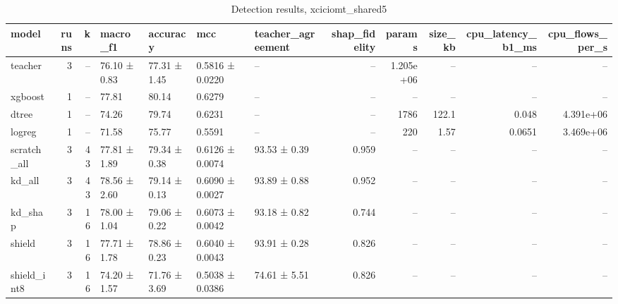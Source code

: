 \begin{table}
\caption{Detection results, xciciomt_shared5}
\begin{tabular}{lrrllllrrrrr}
\toprule
model & runs & k & macro_f1 & accuracy & mcc & teacher_agreement & shap_fidelity & params & size_kb & cpu_latency_b1_ms & cpu_flows_per_s \\
\midrule
teacher & 3 & -- & 76.10 ± 0.83 & 77.31 ± 1.45 & 0.5816 ± 0.0220 & -- & -- & 1.205e+06 & -- & -- & -- \\
xgboost & 1 & -- & 77.81 & 80.14 & 0.6279 & -- & -- & -- & -- & -- & -- \\
dtree & 1 & -- & 74.26 & 79.74 & 0.6231 & -- & -- & 1786 & 122.1 & 0.048 & 4.391e+06 \\
logreg & 1 & -- & 71.58 & 75.77 & 0.5591 & -- & -- & 220 & 1.57 & 0.0651 & 3.469e+06 \\
scratch_all & 3 & 43 & 77.81 ± 1.89 & 79.34 ± 0.38 & 0.6126 ± 0.0074 & 93.53 ± 0.39 & 0.959 & -- & -- & -- & -- \\
kd_all & 3 & 43 & 78.56 ± 2.60 & 79.14 ± 0.13 & 0.6090 ± 0.0027 & 93.89 ± 0.88 & 0.952 & -- & -- & -- & -- \\
kd_shap & 3 & 16 & 78.00 ± 1.04 & 79.06 ± 0.22 & 0.6073 ± 0.0042 & 93.18 ± 0.82 & 0.744 & -- & -- & -- & -- \\
shield & 3 & 16 & 77.71 ± 1.78 & 78.86 ± 0.23 & 0.6040 ± 0.0043 & 93.91 ± 0.28 & 0.826 & -- & -- & -- & -- \\
shield_int8 & 3 & 16 & 74.20 ± 1.57 & 71.76 ± 3.69 & 0.5038 ± 0.0386 & 74.61 ± 5.51 & 0.826 & -- & -- & -- & -- \\
\bottomrule
\end{tabular}
\end{table}
